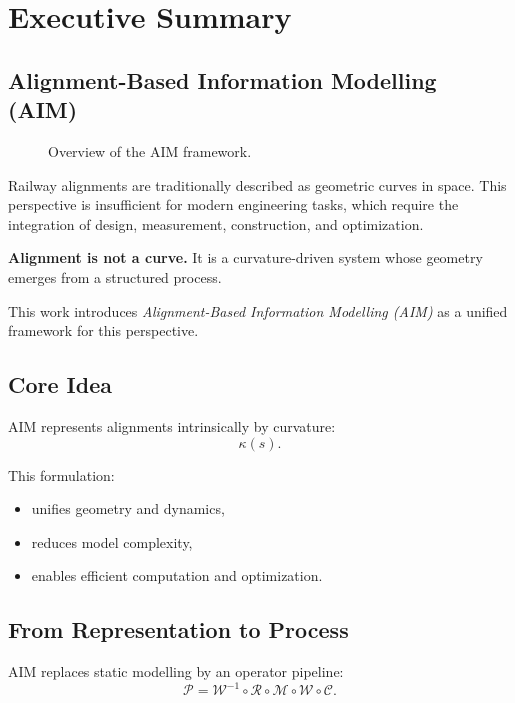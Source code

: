 
\cleardoublepage
\chapter*{Executive Summary}
{}

\section*{Alignment-Based Information Modelling (AIM)}

\begin{figure}[ht]
\centering

\caption{Overview of the AIM framework.}
\label{fig:aim-overview}
\end{figure}


Railway alignments are traditionally described as geometric curves in
space.  
This perspective is insufficient for modern engineering tasks, which
require the integration of design, measurement, construction, and
optimization.

\textbf{Alignment is not a curve.}  
It is a curvature-driven system whose geometry emerges from a structured
process.

This work introduces \emph{Alignment-Based Information Modelling (AIM)}
as a unified framework for this perspective.


\section*{Core Idea}

AIM represents alignments intrinsically by curvature:
\[
\kappa(s).
\]

This formulation:
\begin{itemize}
\item unifies geometry and dynamics,
\item reduces model complexity,
\item enables efficient computation and optimization.
\end{itemize}


\section*{From Representation to Process}

AIM replaces static modelling by an operator pipeline:
\[
\mathcal{P}
=
\mathcal{W}^{-1}
\circ
\mathcal{R}
\circ
\mathcal{M}
\circ
\mathcal{W}
\circ
\mathcal{C}.
\]


